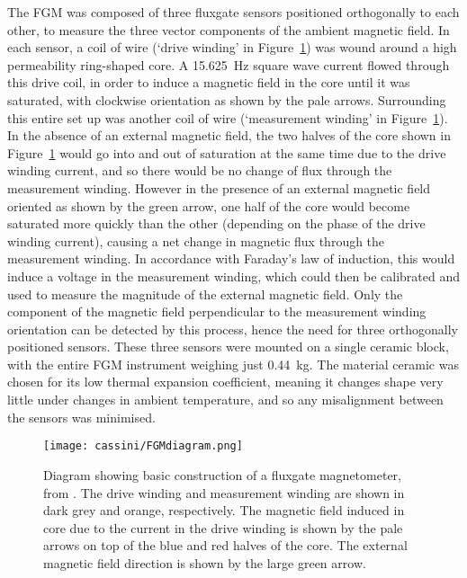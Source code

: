 The FGM was composed of three fluxgate sensors positioned orthogonally to each other, to measure the three vector components of the ambient magnetic field.  In each sensor, a coil of wire (`drive winding' in Figure~\ref{cassini:fig:FGMdiagram}) was wound around a high permeability ring-shaped core. A \SI{15.625}{\hertz} square wave current flowed through this drive coil, in order to induce a magnetic field in the core until it was saturated, with clockwise orientation as shown by the pale arrows. Surrounding this entire set up was another coil of wire (`measurement winding' in Figure~\ref{cassini:fig:FGMdiagram}). In the absence of an external magnetic field, the two halves of the core shown in Figure~\ref{cassini:fig:FGMdiagram} would go into and out of saturation at the same time due to the drive winding current, and so there would  be no change of  flux through the measurement winding. However in the presence of an external magnetic field  oriented as shown by  the green arrow, one half of the core would become saturated more quickly than the other (depending on the phase of the drive winding current), causing a net change in magnetic flux through the measurement winding. In accordance with Faraday's law of  induction, this  would induce a voltage in  the measurement winding,  which could then be calibrated and used to measure the magnitude  of the external magnetic field. Only the component of the magnetic field perpendicular to the measurement winding orientation can be detected by this process, hence the need for three orthogonally positioned sensors. These three sensors were mounted on a single ceramic block, with the entire FGM  instrument  weighing just \SI{0.44}{kg}. The material ceramic was chosen for its low thermal expansion coefficient,  meaning  it changes shape very little under  changes in ambient temperature, and so any misalignment between the sensors was minimised.

\begin{figure}
\centering
\noindent\texttt{[image: cassini/FGMdiagram.png]}
\caption[Diagram of how a fluxgate magnetometer works.]{Diagram showing basic construction of a fluxgate magnetometer, from \citet{carisma2018}. The drive winding and measurement winding are shown in dark grey and orange, respectively. The magnetic field induced in core due to the current in  the drive winding  is shown by  the pale arrows on top of  the blue and red halves of the  core. The external magnetic field direction is shown by the large green arrow.}
\label{cassini:fig:FGMdiagram}
\end{figure}

